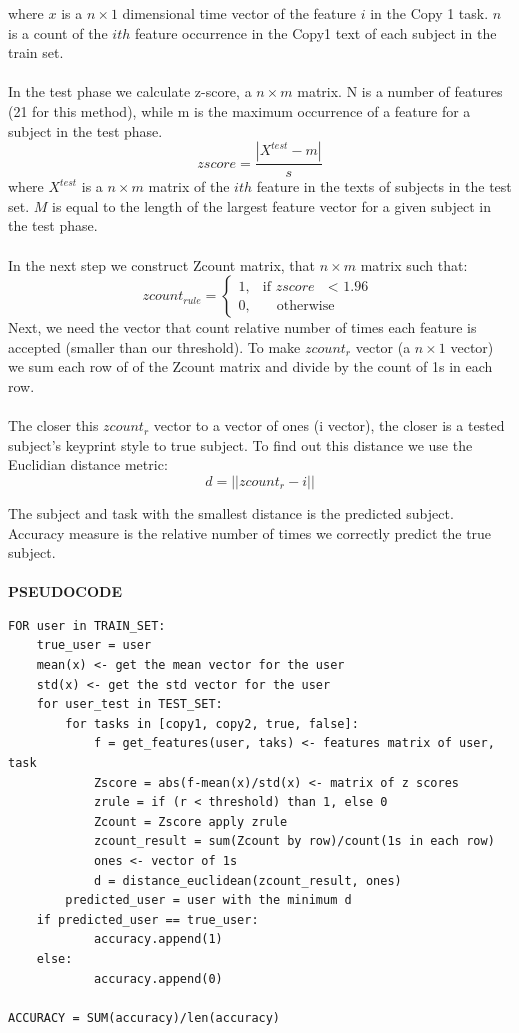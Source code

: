 \documentclass[12pt,a4]{article}
\begin{document}
where $x$ is a $n\times 1$ dimensional time vector of the feature $i$ in the Copy 1 task. $n$ is a count of the $ith$ feature occurrence in the Copy1 text of each subject in the train set.\\
\\
In the test phase we calculate z-score, a $n \times m$ matrix. N is a number of features (21 for this method), while m is the maximum occurrence of a feature for a subject in the test phase.
$$
zscore = \frac{|X^{test} - m|}{s}
$$
where $X^{test}$ is a $n\times m$ matrix of the $ith$ feature in the texts of subjects in the test set. $M$ is equal to the length of the largest feature vector for a given subject in the test phase. \\
\\
In the next step we construct Zcount matrix, that $n \times m$ matrix such that:
$$
zcount_{rule} = \begin{cases} 1, & \mbox{if } zscore \mbox{ $<$ 1.96} \\ 0, & \mbox{ } \mbox{ otherwise} \end{cases}
$$
Next, we need the vector that count relative number of times each feature is accepted (smaller than our threshold). To make $zcount_r$ vector (a $n \times 1$ vector) we sum each row of of the Zcount matrix and divide by the count of 1s in each row.
\\
\\
The closer this $zcount_r$ vector to a vector of ones (i vector), the closer is a tested subject's keyprint style to true subject. To find out this distance we use the Euclidian distance metric: 
$$
d = ||zcount_r - i||
$$

The subject and task with the smallest distance is the predicted subject. Accuracy measure is the relative number of times we correctly predict the true subject.\\
\\
\small\textbf{PSEUDOCODE}

\normalsize

\begin{lstlisting}
FOR user in TRAIN_SET:
    true_user = user
    mean(x) <- get the mean vector for the user
    std(x) <- get the std vector for the user
    for user_test in TEST_SET:
        for tasks in [copy1, copy2, true, false]:
            f = get_features(user, taks) <- features matrix of user, task
            Zscore = abs(f-mean(x)/std(x) <- matrix of z scores
            zrule = if (r < threshold) than 1, else 0
            Zcount = Zscore apply zrule
            zcount_result = sum(Zcount by row)/count(1s in each row)
            ones <- vector of 1s
            d = distance_euclidean(zcount_result, ones)
        predicted_user = user with the minimum d
    if predicted_user == true_user:
            accuracy.append(1)
    else:
            accuracy.append(0)
            
ACCURACY = SUM(accuracy)/len(accuracy)

\end{lstlisting}
\end{document}

